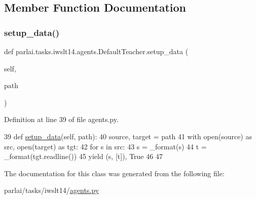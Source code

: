 \subsection{Member Function Documentation}
\mbox{\label{classparlai_1_1tasks_1_1iwslt14_1_1agents_1_1DefaultTeacher_a3294d31a37e9260469383275154df900}} 
\subsubsection{\texorpdfstring{setup\+\_\+data()}{setup\_data()}}
{\footnotesize\ttfamily def parlai.\+tasks.\+iwslt14.\+agents.\+Default\+Teacher.\+setup\+\_\+data (\begin{DoxyParamCaption}\item[{}]{self,  }\item[{}]{path }\end{DoxyParamCaption})}



Definition at line 39 of file agents.\+py.


\begin{DoxyCode}
39     \textcolor{keyword}{def }\hyperlink{namespaceparlai_1_1tasks_1_1multinli_1_1agents_a4fa2cb0ba1ed745336ad8bceed36b841}{setup\_data}(self, path):
40         source, target = path
41         with open(source) \textcolor{keyword}{as} src, open(target) \textcolor{keyword}{as} tgt:
42             \textcolor{keywordflow}{for} s \textcolor{keywordflow}{in} src:
43                 s = \_format(s)
44                 t = \_format(tgt.readline())
45                 \textcolor{keywordflow}{yield} (s, [t]), \textcolor{keyword}{True}
46 
47 
\end{DoxyCode}


The documentation for this class was generated from the following file\+:\begin{DoxyCompactItemize}
\item 
parlai/tasks/iwslt14/\hyperlink{parlai_2tasks_2iwslt14_2agents_8py}{agents.\+py}\end{DoxyCompactItemize}
